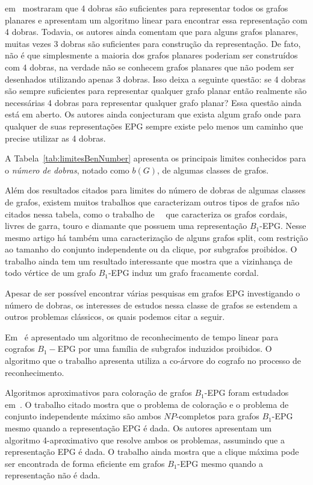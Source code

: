 \citeauthor{daniel2014b} em~\cite{daniel2014b} mostraram que 4 dobras são suficientes para representar todos os grafos planares  e apresentam um algoritmo linear para encontrar essa representação com 4 dobras. Todavia, os autores ainda comentam que para alguns grafos planares, muitas vezes 3 dobras são suficientes para construção da representação. De fato, não é que simplesmente a maioria dos grafos planares poderiam ser construídos com 4 dobras, na verdade não se conhecem grafos planares que não podem ser desenhados utilizando apenas 3 dobras.   Isso deixa a seguinte questão: se 4 dobras são sempre suficientes para representar qualquer grafo planar então realmente são necessárias 4 dobras para representar qualquer grafo planar? Essa questão ainda está em aberto. Os autores ainda conjecturam que exista algum grafo onde para qualquer de suas representações EPG sempre existe pelo menos um caminho que precise utilizar as 4 dobras.

A Tabela~\ref{tab:limitesBenNumber} apresenta os principais limites conhecidos para o \textit{número de dobras}, notado como $b(G)$, de algumas classes de grafos.  




Além dos resultados citados para limites do número de dobras de algumas classes de grafos, existem muitos trabalhos que caracterizam outros tipos de grafos não citados nessa tabela, como o trabalho de~\citeauthor{ries2009}~\citep{ries2009} que caracteriza os grafos cordais, livres de garra, touro e diamante que possuem uma representação $B_{1}$-EPG. Nesse mesmo artigo há também uma caracterização de alguns grafos split, com restrição ao tamanho do conjunto independente ou da clique, por subgrafos proibidos. O trabalho ainda tem um resultado interessante que mostra que a vizinhança de todo vértice de um grafo $B_1$-EPG induz um grafo fracamente cordal.

Apesar de ser possível encontrar várias pesquisas em grafos EPG investigando o número de dobras, os interesses de estudos nessa classe de grafos se estendem a outros problemas clássicos, os quais podemos citar a seguir.

Em~\citet{cohen2014} é apresentado um algoritmo de reconhecimento de tempo linear para cografos $B_{1}-$EPG por uma família de subgrafos induzidos proibidos. O algoritmo que o trabalho apresenta utiliza a co-árvore do cografo no processo de reconhecimento.
 
 Algoritmos aproximativos para coloração de grafos $B_1$-EPG foram estudados em~\cite{epstein2013approximation}. O trabalho citado mostra que o problema de coloração e o problema de conjunto independente máximo são ambos $NP$-completos para grafos $B_1$-EPG mesmo quando a representação EPG é dada. Os autores apresentam um algoritmo  4-aproximativo que resolve ambos os problemas, assumindo que a representação EPG é dada. O trabalho ainda mostra que a clique máxima pode ser encontrada de forma eficiente em grafos $B_1$-EPG mesmo quando a representação não é dada.
 
